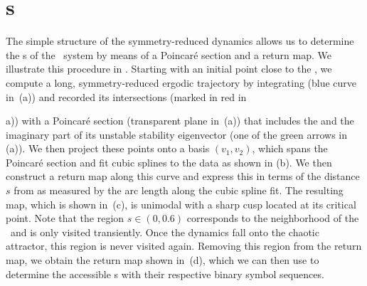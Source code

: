 \section{\Po s}
\label{s:numerics}

The simple structure of the symmetry-reduced dynamics allows us to
determine the \rpo s of the \twomode\ system by means of a Poincar\'e
section and a return map. We illustrate this procedure in
. Starting with an initial point close to the
\REQV{}{}, we compute a long, symmetry-reduced ergodic trajectory by integrating
 (blue curve in
\,(a)) and recorded its intersections (marked
in red in \,{a)) with a Poincar\'e section
(transparent plane in \,(a)) that includes
the \REQV{}{} and the imaginary part of its unstable stability
eigenvector (one of the green arrows in (a)).
We then project these points onto a basis $(v_1, v_2)$, which
spans the Poincar\'e section and fit cubic splines to the data as shown in (b).
We then construct a return map along this curve and express this in terms of the distance $s$ from \REQV{}{}
as measured by the arc length along the cubic spline fit. The resulting map, which is shown in
\,(c), is unimodal with a sharp cusp located at its critical point.
Note that the region $s \in (0, 0.6)$ corresponds to
the neighborhood of the \reqv\  and is only visited transiently. Once the dynamics fall onto the chaotic
attractor, this region is never visited again. Removing this region from the return map, we
obtain the return map shown in \,(d), which we can then use to determine the
accessible \rpo s  with their respective binary symbol sequences.

}
